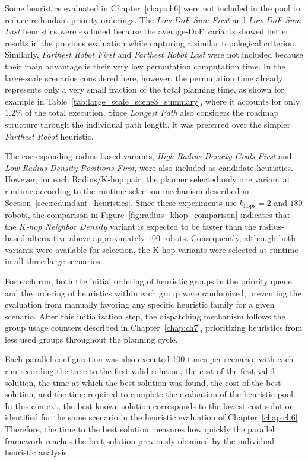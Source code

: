Some heuristics evaluated in Chapter~\ref{chap:ch6} were not included in the pool to reduce
redundant priority orderings. The \textit{Low DoF Sum First} and \textit{Low DoF Sum Last}
heuristics were excluded because the average-DoF variants showed better results in the previous
evaluation while capturing a similar topological criterion. Similarly, \textit{Farthest Robot First}
and \textit{Farthest Robot Last} were not included because their main advantage is their very low
permutation computation time. In the large-scale scenarios considered here, however, the
permutation time already represents only a very small fraction of the total planning time, as shown
for example in Table~\ref{tab:large_scale_scene3_summary}, where it accounts for only \(1.2\%\)
of the total execution. Since \textit{Longest Path} also considers the roadmap structure through the
individual path length, it was preferred over the simpler \textit{Farthest Robot} heuristic.

The corresponding radius-based variants, \textit{High Radius Density Goals First} and
\textit{Low Radius Density Positions First}, were also included as candidate heuristics. However,
for each Radius/K-hop pair, the planner selected only one variant at runtime according to the
runtime selection mechanism described in Section~\ref{sec:redundant_heuristics}. Since these
experiments use \(k_{\text{hops}}=2\) and \(180\) robots, the comparison in
Figure~\ref{fig:radius_khop_comparison} indicates that the \textit{\(K\)-hop Neighbor Density} variant is
expected to be faster than the radius-based alternative above approximately \(100\) robots.
Consequently, although both variants were available for selection, the K-hop variants were selected
at runtime in all three large scenarios.

For each run, both the initial ordering of heuristic groups in the priority queue and the ordering of
heuristics within each group were randomized, preventing the evaluation from manually favoring
any specific heuristic family for a given scenario. After this initialization step, the dispatching
mechanism follows the group usage counters described in Chapter~\ref{chap:ch7}, prioritizing
heuristics from less used groups throughout the planning cycle.

Each parallel configuration was also executed 100 times per scenario, with each run recording the
time to the first valid solution, the cost of the first valid solution, the time at which the best
solution was found, the cost of the best solution, and the time required to complete the evaluation
of the heuristic pool. In this context, the best known solution corresponds to the lowest-cost
solution identified for the same scenario in the heuristic evaluation of Chapter~\ref{chap:ch6}.
Therefore, the time to the best solution measures how quickly the parallel framework reaches the
best solution previously obtained by the individual heuristic analysis.

